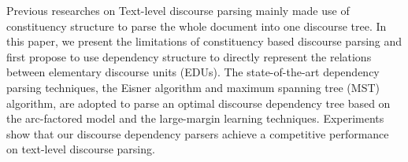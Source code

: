 Previous researches on Text-level discourse parsing mainly made use of constituency structure to parse the whole document into one discourse tree. In this paper, we present the limitations of constituency based discourse parsing and first propose to use dependency structure to directly represent the relations between elementary discourse units (EDUs). The state-of-the-art dependency parsing techniques, the Eisner algorithm and maximum spanning tree (MST) algorithm, are adopted to parse an optimal discourse dependency tree based on the arc-factored model and the large-margin learning techniques. Experiments show that our discourse dependency parsers achieve a competitive performance on text-level discourse parsing.
